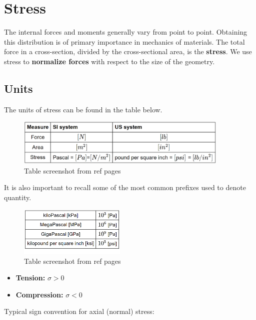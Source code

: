 \section{Stress}
The internal forces and moments generally vary from point to point. Obtaining this distribution is of primary importance in mechanics of materials. The total force in a cross-section, divided by the cross-sectional area, is the \textbf{stress}. We use stress to \textbf{normalize forces} with respect to the size of the geometry.

\subsection{Units}
The units of stress can be found in the table below.

\begin{figure}[!h]
\centering
\includegraphics[angle=0, width=4in]{Stress-Figures/Units.png}
\vspace{-2mm}
\caption{\small Table screenshot from ref pages}
\vspace{-3mm}
\label{Table:Units}
\end{figure}

\noindent It is also important to recall some of the most common prefixes used to denote quantity.

\begin{figure}[!h]
\centering
\includegraphics[angle=0, width=2in]{Stress-Figures/Prefixes.png}
\vspace{-2mm}
\caption{\small Table screenshot from ref pages}
\vspace{-3mm}
\label{Table:Prefixes}
\end{figure}

\begin{itemize}
    \item \textbf{Tension:} $\sigma > 0$
    \item \textbf{Compression:} $\sigma < 0$
\end{itemize}
Typical sign convention for axial (normal) stress:

